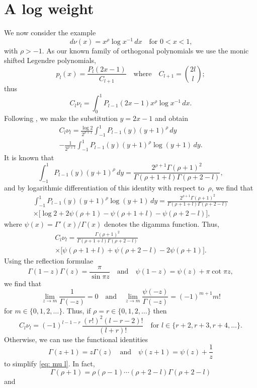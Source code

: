 \documentclass[12pt,a4paper]{article}
\begin{document}
\section{A log weight}
We now consider the example
\[
d\nu(x)=x^\rho\log x^{-1}\,dx\quad\text{for $0<x<1$,}
\]
with $\rho>-1$.  As our known family of orthogonal polynomials we 
use the monic shifted Legendre polynomials,
\[
p_l(x)=\frac{P_l(2x-1)}{C_{l+1}}
\quad\text{where}\quad
C_{l+1}=\binom{2l}{l};
\]
thus
\[
C_l\nu_l=\int_0^1 P_{l-1}(2x-1)x^\rho\log x^{-1}\,dx.
\]
Following \cite{Gautschi1979}, we make the substitution $y=2x-1$
and obtain
\begin{multline*}
C_l\nu_l=\frac{\log 2}{2^{\rho+1}}\int_{-1}^1 
	P_{l-1}(y)(y+1)^\rho\,dy\\
	-\frac{1}{2^{\rho+1}}\int_{-1}^1 
		P_{l-1}(y)(y+1)^\rho\log(y+1)\,dy.
\end{multline*}
It is known that
\[
\int_{-1}^1 P_{l-1}(y)(y+1)^\rho\,dy
	=\frac{2^{\rho+1}\Gamma(\rho+1)^2}%
{\Gamma(\rho+1+l)\Gamma(\rho+2-l)},
\]
and by logarithmic differentiation of this identity with respect 
to~$\rho$, we find that
\begin{multline*}
\int_{-1}^1 P_{l-1}(y)(y+1)^\rho\log(y+1)\,dy
	=\frac{2^{\rho+1}\Gamma(\rho+1)^2}%
{\Gamma(\rho+1+l)\Gamma(\rho+2-l)}\\
	\times\bigl[\log2+2\psi(\rho+1)-\psi(\rho+1+l)-\psi(\rho+2-l)
	\bigr],
\end{multline*}
where $\psi(x)=\Gamma'(x)/\Gamma(x)$ denotes the digamma function.
Thus,
\begin{multline}\label{eq: mu l}
C_l\nu_l
	=\frac{\Gamma(\rho+1)^2}{\Gamma(\rho+1+l)\Gamma(\rho+2-l)} \\
	\times\bigl[\psi(\rho+1+l)+\psi(\rho+2-l)-2\psi(\rho+1)\bigr].
\end{multline}
Using the reflection formulae
\[
\Gamma(1-z)\Gamma(z)=\frac{\pi}{\sin\pi z}
\quad\text{and}\quad
\psi(1-z)=\psi(z)+\pi\cot\pi z,
\]
we find that
\[
\lim_{z\to m}\frac{1}{\Gamma(-z)}=0
\quad\text{and}\quad
\lim_{z\to m}\frac{\psi(-z)}{\Gamma(-z)}=(-1)^{m+1}m!
\]
for $m\in\{0,1,2,\dots\}$.  Thus, if $\rho=r\in\{0,1,2,\dots\}$
then
\[
C_l\nu_l=(-1)^{l-1-r}\,\frac{(r!)^2(l-r-2)!}{(l+r)!}
	\quad\text{for $l\in\{r+2, r+3, r+4, \dots\}$.}
\]
Otherwise, we can use the functional identities
\[
\Gamma(z+1)=z\Gamma(z)\quad\text{and}\quad
\psi(z+1)=\psi(z)+\frac{1}{z}
\]
to simplify \eqref{eq: mu l}.  In fact,
\[
\Gamma(\rho+1)=\rho(\rho-1)\cdots(\rho+2-l)\Gamma(\rho+2-l)
\]
and
\end{document}
